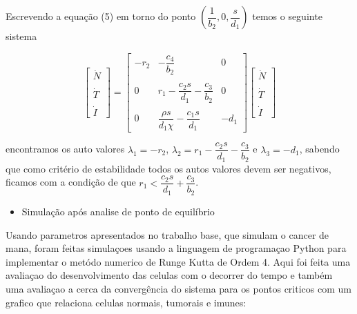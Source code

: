 \documentclass[12pt, a4paper]{article}
\begin{document}
Escrevendo a equação (5) em torno do ponto $(\dfrac{1}{b_2}, 0, \dfrac{s}{d_1})$ temos o seguinte sistema

$$
\left[ 
\begin{array}{c}
\dot{N} \\ \\
\dot{T} \\ \\
\dot{I}
\end{array}  
\right]
=
\left[ 
\begin{array}{ccc}
-r_2 & -\dfrac{c_4}{b_2} & 0 \\ \\
0 & r_1 - \dfrac{c_2 s}{d_1} - \dfrac{c_3}{b_2} & 0 \\ \\
0 & \dfrac{\rho s}{d_1 \chi} - \dfrac{c_1 s}{d_1} & -d_1 
\end{array}  
\right]
\left[ 
\begin{array}{c}
\dot{N} \\ \\
\dot{T} \\ \\
\dot{I}
\end{array}  
\right]
$$

encontramos os auto valores $\lambda_1 = -r_2$, $\lambda_2 = r_1 - \dfrac{c_2 s}{d_1} - \dfrac{c_3}{b_2}$ e $\lambda_3 = -d_1$, sabendo que como critério de estabilidade todos os autos valores devem ser negativos, ficamos com a condição de que $r_1 < \dfrac{c_2 s}{d_1} + \dfrac{c_3}{b_2}$.

\begin{itemize}
\item Simulação após analise de ponto de equilíbrio
\end{itemize}

Usando parametros apresentados no trabalho base, que simulam o cancer de mana, foram feitas simulaçoes usando a linguagem de programaçao Python para implementar o metódo numerico de Runge Kutta de Ordem 4. Aqui foi feita uma avaliaçao do desenvolvimento das celulas com o decorrer do tempo e também uma avaliaçao a cerca da convergência do sistema para os pontos criticos com um grafico que relaciona celulas normais, tumorais e imunes:

\end{document}
